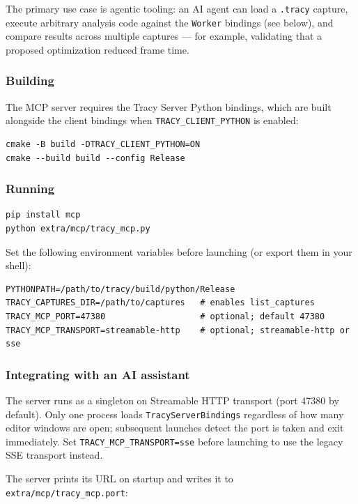 \documentclass[hidelinks,titlepage,a4paper,twoside]{article}
\begin{document}
The primary use case is agentic tooling: an AI agent can load a \texttt{.tracy} capture, execute arbitrary analysis code against the \texttt{Worker} bindings (see below), and compare results across multiple captures — for example, validating that a proposed optimization reduced frame time.

\subsubsection{Building}

The MCP server requires the Tracy Server Python bindings, which are built alongside the client bindings when \texttt{TRACY\_CLIENT\_PYTHON} is enabled:

\begin{lstlisting}
cmake -B build -DTRACY_CLIENT_PYTHON=ON
cmake --build build --config Release
\end{lstlisting}

\subsubsection{Running}

\begin{lstlisting}
pip install mcp
python extra/mcp/tracy_mcp.py
\end{lstlisting}

Set the following environment variables before launching (or export them in your shell):

\begin{lstlisting}
PYTHONPATH=/path/to/tracy/build/python/Release
TRACY_CAPTURES_DIR=/path/to/captures   # enables list_captures
TRACY_MCP_PORT=47380                   # optional; default 47380
TRACY_MCP_TRANSPORT=streamable-http    # optional; streamable-http or sse
\end{lstlisting}

\subsubsection{Integrating with an AI assistant}

The server runs as a singleton on Streamable HTTP transport (port 47380 by default). Only one process loads \texttt{TracyServerBindings} regardless of how many editor windows are open; subsequent launches detect the port is taken and exit immediately. Set \texttt{TRACY\_MCP\_TRANSPORT=sse} before launching to use the legacy SSE transport instead.

The server prints its URL on startup and writes it to \texttt{extra/mcp/tracy\_mcp.port}:
\end{document}
